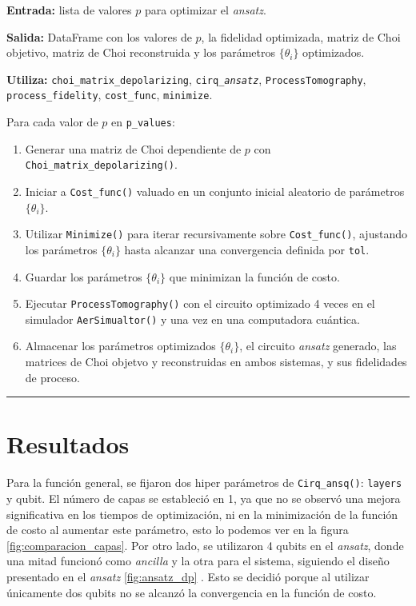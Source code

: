 \documentclass[letterpaper,12pt]{thesisECFM}
\theoremstyle{plain}
\theoremstyle{definition}
\theoremstyle{definition}
\theoremstyle{remark}
\newcommand{\1}{\mathbb{1}}
\begin{document}
\noindent\textbf{Entrada:} lista de valores $p$ para optimizar el \textit{ansatz}.

\noindent\textbf{Salida:} DataFrame con los valores de $p$, la fidelidad
optimizada, matriz de Choi objetivo, matriz de Choi reconstruida y los
parámetros $\{\theta_i\}$ optimizados.

\noindent\textbf{Utiliza:} \texttt{choi\_matrix\_depolarizing},
\texttt{cirq\_\textit{ansatz}}, \texttt{ProcessTomography}, \texttt{process\_fidelity},
\texttt{cost\_func}, \texttt{minimize}. \newline

Para cada valor de $p$ en \texttt{p\_values}: 
\begin{enumerate}
    \item Generar una matriz de Choi dependiente de $p$ con \texttt{Choi\_matrix\_depolarizing()}.
    \item Iniciar a  \texttt{Cost\_func()} valuado en un conjunto inicial
aleatorio de parámetros $\{\theta_i\}$. 
   \item Utilizar \texttt{Minimize()} para iterar recursivamente sobre
\texttt{Cost\_func()}, ajustando los parámetros $\{\theta_i\}$ hasta alcanzar
una convergencia definida por \texttt{tol}.
   \item Guardar los parámetros $\{ \theta_i\}$ que minimizan la función de
costo. 
   \item Ejecutar \texttt{ProcessTomography()} con el circuito optimizado 4
veces en el simulador \texttt{AerSimualtor()} y una vez en una computadora
cuántica. 
    \item Almacenar los parámetros optimizados $\{ \theta_i\}$, el circuito
\textit{ansatz} generado, las matrices de Choi objetvo y reconstruidas en ambos
sistemas, y sus fidelidades de proceso. 
\end{enumerate}
\vspace{-.5cm}
\noindent\rule{\textwidth}{1mm}
\section{Resultados} %
Para la función general, se fijaron dos hiper parámetros de
\texttt{Cirq\_ansq()}: \texttt{layers} y  qubit. El número de capas se
estableció en 1, ya que no se observó una mejora significativa en los tiempos
de optimización, ni en la minimización de la función de costo al aumentar este
parámetro, esto lo podemos ver en la figura \ref{fig:comparacion_capas}. Por
otro lado, se utilizaron 4 qubits en el \textit{ansatz}, donde una mitad
funcionó como \textit{ancilla} y la otra para el sistema, siguiendo el diseño
presentado en el \textit{ansatz} \ref{fig:ansatz_dp} . Esto se decidió porque al
utilizar únicamente dos  qubits no se alcanzó la convergencia en la función de
costo. 
\end{document}
